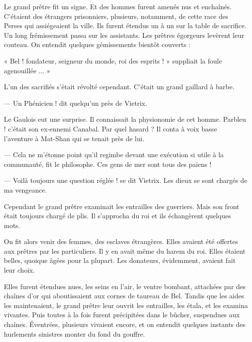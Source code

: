 \documentclass[a4paper, 11pt, oneside, polutonikogreek, french]{article}
\begin{document}
\bigskip
\centerline{\EightStarTaper}
\centerline{\EightStarTaper\EightStarTaper}
\bigskip

Le grand prêtre fit un signe. Et des hommes furent amenés nus et enchaînés. C'étaient des étrangers prisonniers, plusieurs, notamment, de cette race des Perses qui assiégeaient la ville. Ils furent étendus un à un sur la table de sacrifice. Un long frémissement passa sur les assistants. Les prêtres égorgeurs levèrent leur couteau. On entendit quelques gémissements bientôt couverts :

« Bel ! fondateur, seigneur du monde, roi des esprits ! » suppliait la foule agenouillée ... »

L'un des sacrifiés s'était révolté cependant. C'était un grand gaillard à barbe.

--- Un Phénicien ! dit quelqu'un près de Vietrix.

Le Gaulois eut une surprise. Il connaissait la physionomie de cet homme. Parbleu ! c'était son ex-ennemi Canabal. Par quel hasard ? Il conta à voix basse l'aventure à Mat-Shan qui se tenait près de lui.

--- Cela ne m'étonne point qu'il regimbe devant une exécution si utile à la communauté, fit le philosophe. Ces gens de mer sont tous des païens !

--- Voilà toujours une question réglée ! se dit Vietrix. Les dieux se sont chargés de ma vengeance.

Cependant le grand prêtre examinait les entrailles des guerriers. Mais son front était toujours chargé de plis. Il s'approcha du roi et ils échangèrent quelques mots.

\bigskip
\centerline{\EightStarTaper}
\centerline{\EightStarTaper\EightStarTaper}
\bigskip

On fit alors venir des femmes, des esclaves étrangères. Elles avaient été offertes aux prêtres par les particuliers. Il y en avait même du harem du roi. Elles étaient belles, quoique âgées pour la plupart. Les donateurs, évidemment, avaient fait leur choix.

Elles furent étendues nues, les seins en l'air, le ventre bombant, attachées par des chaînes d'or qui aboutissaient aux cornes de taureau de Bel. Tandis que les aides les maintenaient, le grand prêtre leur ouvrit les entrailles, les étala, et les examina vivantes. Puis toutes à la fois furent précipitées dans le bûcher, suspendues aux chaînes. Éventrées, plusieurs vivaient encore, et on entendit quelques instants des hurlements sinistres monter du fond du gouffre.
\end{document}

